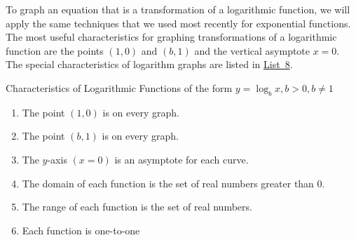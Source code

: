 \documentclass[10pt,]{book}
\theoremstyle{ptxdefinitionnotitle}
\theoremstyle{ptxdefinitiontitle}
\theoremstyle{ptxdefinitionnotitle}
\theoremstyle{ptxdefinitiontitle}
\theoremstyle{ptxdefinitionnotitle}
\theoremstyle{ptxdefinitiontitle}
\numberwithin{equation}{section}
\newenvironment{namedlist}{\par\bigskip\noindent}{}
\newcommand{\gt}{>}
\begin{document}
\par
\hypertarget{p-340}{}%
To graph an equation that is a transformation of a logarithmic function, we will apply the same techniques that we used most recently for exponential functions. The most useful characteristics for graphing transformations of a logarithmic function are the points \(\left( 1,0 \right)\) and \(\left( b,1 \right)\) and the vertical asymptote \(x = 0\). The special characteristics of logarithm graphs are listed in \hyperref[list-log-characteristics]{List~8}.%
\begin{namedlist}
\begin{namedlistcontent}
\hypertarget{p-341}{}%
Characteristics of Logarithmic Functions of the form \(y = \log_b x, b \gt 0, b \neq 1\)%
\leavevmode%
\begin{enumerate}
\item\hypertarget{li-237}{}\hypertarget{p-342}{}%
The point \(\left( 1,0 \right)\) is on every graph.%
\item\hypertarget{li-238}{}\hypertarget{p-343}{}%
The point \(\left( b,1 \right)\) is on every graph.%
\item\hypertarget{li-239}{}\hypertarget{p-344}{}%
The \(y\)-axis \(\left( x = 0 \right)\) is an asymptote for each curve.%
\item\hypertarget{li-240}{}\hypertarget{p-345}{}%
The domain of each function is the set of real numbers greater than 0.%
\item\hypertarget{li-241}{}\hypertarget{p-346}{}%
The range of each function is the set of real numbers.%
\item\hypertarget{li-242}{}\hypertarget{p-347}{}%
Each function is one-to-one%
\end{enumerate}
\end{namedlistcontent}
\end{namedlist}
\end{document}
